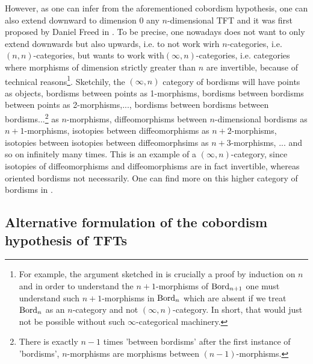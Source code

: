 \begin{rem}
    However, as one can infer from the aforementioned cobordism hypothesis, one can also extend downward to dimension $0$ any $n$-dimensional TFT and it was first proposed by Daniel Freed in \cite{Freed_1994}. To be precise, one nowadays does not want to only extend 
    downwards but also upwards, i.e. to not work wirh $n$-categories, i.e. $(n,n)$-categories,
     but wants to work with$(\infty,n)$-categories, i.e. categories where morphisms of dimension
      strictly greater than $n$ are invertible, because of technical reasons\footnote{For example, the
         argument sketched in \cite{lurie2009classification} is crucially a proof by induction on $n$
          and in order to understand the $n+1$-morphisms of $\operatorname{Bord}_{n+1}$ one must understand
           such $n+1$-morphisms in $\operatorname{Bord}_{n}$ which are absent if we treat $\operatorname{Bord}_{n}$ as an
            $n$-category and not $(\infty,n)$-category. In short, that would just not be possible
             without such $\infty$-categorical machinery.}. 
     Sketchily, the $(\infty,n)$ category of bordisms will have points as objects, bordisms between
      points as 1-morphisms, bordisms between bordisms between points as 2-morphisms,...,
       bordisms between bordisms between bordisms...\footnote{There is exactly $n-1$ times
         'between bordisms' after the first instance of 'bordisms', $n$-morphisms are morphisms
          between $(n-1)$-morphisms.} as $n$-morphisms, diffeomorphisms between
           $n$-dimensional bordisms as $n+1$-morphisms, isotopies between diffeomorphisms as
            $n+2$-morphisms, isotopies between isotopies between diffeomorphsims as
             $n+3$-morphisms, ... and so on infinitely many times.
              This is an example of a $(\infty,n)$-category, since isotopies of diffeomorphisms and
               diffeomorphisms are in fact invertible, whereas oriented bordisms not necessarily.
                One can find more on this higher category of bordisms in \cite{Calaque_2019}. 

\end{rem}

\subsection{Alternative formulation of the cobordism hypothesis of TFTs \extra}\label{FREEBORD}

